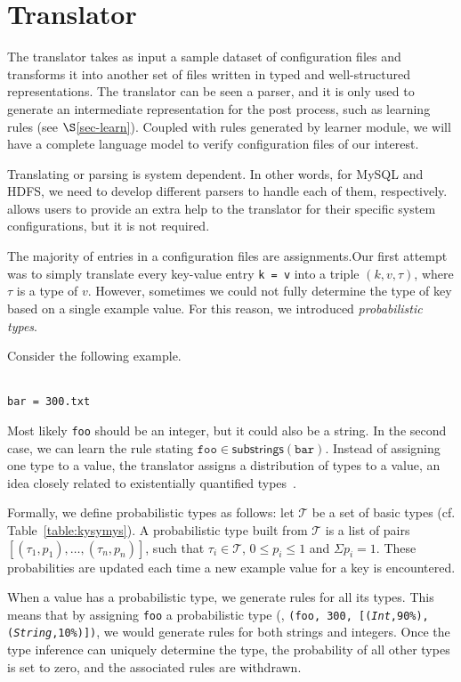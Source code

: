 
\section{Translator}
\label{sec-trans}

The translator takes as input a sample dataset of configuration files and transforms it into another set of files written in
typed and well-structured representations.
The translator can be seen a parser, and it is only
used to generate an intermediate representation for the post
process, such as learning rules (see $\S$\ref{sec-learn}).
Coupled with rules generated by learner module,
we will have a complete language model to verify configuration files
of our interest.

Translating or parsing is system dependent. In other words, for MySQL
and HDFS, we need to develop different parsers to handle each of them,
respectively. \app allows users to 
provide an extra help to the translator
for their specific system configurations,
but it is not required.

The majority of entries in a configuration files are assignments.Our first attempt was to simply
translate every key-value entry {\tt {k = v}} into a triple $(k, v, \tau)$, where $\tau$ is a type of 
$v$. However, sometimes we could not fully determine the type of key 
based on a single example value. For this reason, we introduced {\emph {probabilistic types}}.

Consider the following example.

\\
{\tt {bar = 300.txt}}

Most likely {\tt foo} should be an integer, but it could also be a string.
In the second case, we can learn the rule stating 
$ \texttt{foo} \in \textsf{substrings}(\texttt{bar})$. 
Instead of assigning one type to a value, the translator assigns a distribution of types 
to a value, an idea closely related to existentially quantified 
types~\cite{Launchbury93lazyfunctional}. 

Formally, we define probabilistic types as follows: let $\mathcal{T}$ be a set of basic types (cf. Table~\ref{table:kysymys}).
A probabilistic type built from $\mathcal{T}$ is a list of pairs 
$[(\tau_1, p_1),\ldots,(\tau_n, p_n)]$,
such that $\tau_i \in \mathcal{T}$, $0 \le p_i \le 1$ 
and $\Sigma p_i = 1$. 
These probabilities are updated each time a new example value 
for a key is encountered.

When a value has a probabilistic type, we generate rules for all its types.
This means that by assigning {\texttt{foo}} a probabilistic type 
(\eg, {\tt (\texttt{foo}, 300, [(\textsl{Int},90\%), 
(\textsl{String},10\%)])},
we would generate rules for both strings and integers.
Once the type inference can uniquely determine the type, 
the probability of all other types is set to zero, 
and the associated rules are withdrawn.

